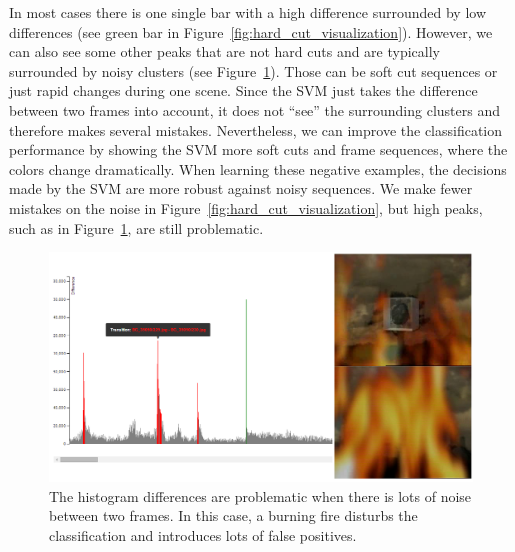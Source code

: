 In most cases there is one single bar with a high difference surrounded by low differences (see green bar in Figure~\ref{fig:hard_cut_visualization}).
However, we can also see some other peaks that are not hard cuts and are typically surrounded by noisy clusters (see Figure~\ref{fig:hard_cut_noise_visualization}).
Those can be soft cut sequences or just rapid changes during one scene.
Since the SVM just takes the difference between two frames into account, it does not ``see'' the surrounding clusters and therefore makes several mistakes.
Nevertheless, we can improve the classification performance by showing the SVM more soft cuts and frame sequences, where the colors change dramatically.
When learning these negative examples, the decisions made by the SVM are more robust against noisy sequences.
We make fewer mistakes on the noise in Figure~\ref{fig:hard_cut_visualization}, but high peaks, such as in Figure~\ref{fig:hard_cut_noise_visualization}, are still problematic.

\begin{figure}[ht]
	\centering
	\includegraphics[scale=.3]{images/hard_cut_noise_visualization2.png}
	\caption{The histogram differences are problematic when there is lots of noise between two frames. In this case, a burning fire disturbs the classification and introduces lots of false positives.}
	\label{fig:hard_cut_noise_visualization}
\end{figure}
